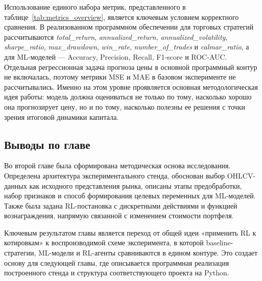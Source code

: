 Использование единого набора метрик, представленного в таблице~\ref{tab:metrics_overview}, является ключевым условием корректного сравнения. В реализованном программном обеспечении для торговых стратегий рассчитываются \textit{total\_return}, \textit{annualized\_return}, \textit{annualized\_volatility}, \textit{sharpe\_ratio}, \textit{max\_drawdown}, \textit{win\_rate}, \textit{number\_of\_trades} и \textit{calmar\_ratio}, а для ML-моделей --- Accuracy, Precision, Recall, F1-score и ROC-AUC. Отдельная регрессионная задача прогноза цены в основной программный контур не включалась, поэтому метрики MSE и MAE в базовом эксперименте не рассчитывались. Именно на этом уровне проявляется основная методологическая идея работы: модель должна оцениваться не только по тому, насколько хорошо она прогнозирует цену, но и по тому, насколько полезны ее решения с точки зрения итоговой динамики капитала.

\subsection{Выводы по главе}

Во второй главе была сформирована методическая основа исследования. Определена архитектура экспериментального стенда, обоснован выбор OHLCV-данных как исходного представления рынка, описаны этапы предобработки, набор признаков и способ формирования целевых переменных для ML-моделей. Также была задана RL-постановка с дискретными действиями и функцией вознаграждения, напрямую связанной с изменением стоимости портфеля.

Ключевым результатом главы является переход от общей идеи «применить RL к котировкам» к воспроизводимой схеме эксперимента, в которой baseline-стратегии, ML-модели и RL-агенты сравниваются в едином контуре. Это создает основу для следующей главы, где описывается программная реализация построенного стенда и структура соответствующего проекта на Python.
